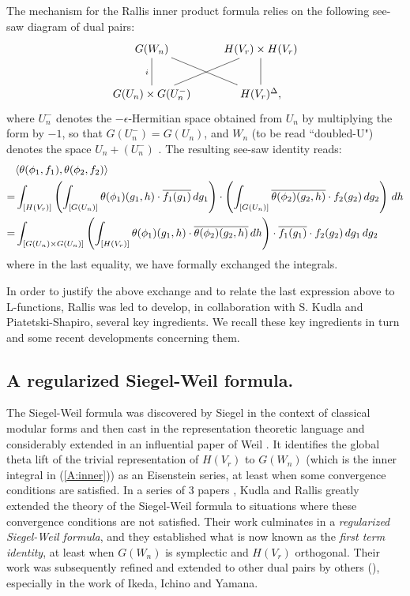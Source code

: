 \documentclass[10pt]{amsart}
\theoremstyle{plain}
\numberwithin{equation}{section}
\begin{document}
The mechanism for the Rallis inner product formula relies on the
following see-saw diagram of dual pairs:
\[
    \xymatrix{
    G(W_n)\ar@{-}[d]_{i}\ar@{-}[dr]&H(V_r)\times H(V_r)\ar@{-}[d]\\
    G(U_n)\times G(U^-_n)\ar@{-}[ur]&H(V_r)^{\Delta},
    }
\]
where $U^{-}_n$ denotes the $-\epsilon$-Hermitian space obtained from
$U_n$ by multiplying the form by $-1$, so that $G(U^-_n) = G(U_n)$,
and $W_n$ (to be read ``doubled-U") denotes the space $U_n + ( U^-_n)$
.  The resulting see-saw identity reads:  
\begin{align}  \label{A:inner}
 & \langle \theta(\phi_1, f_1), \theta(\phi_2,f_2) \rangle  \notag \\
 = & \int_{[H(V_r)]} \left( \int_{ [G(U_n)]} \theta(\phi_1)(g_1,h)
   \cdot \overline{f_1(g_1)} \, dg_1 \right) \cdot 
\left(  \int_{ [G(U_n)]} 
\overline{ \theta(\phi_2)(g_2,h)} \cdot f_2(g_2) \, dg_2 \right) \, dh \notag \\
= & \int_{ [G(U_n) \times  G(U_n)]} \left( \int_{ [H(V_r)]}
  \theta(\phi_1)(g_1, h) \cdot \overline{ \theta(\phi_2) (g_2,h)} \,
  dh \right) \cdot  
  \overline{f_1(g_1)} \cdot f_2(g_2) \, dg_1 \, dg_2 
\end{align}
where in the last equality, we have formally exchanged the integrals. 
\vskip 5pt

In order to justify the above exchange and to relate the last expression above to L-functions, 
Rallis was led to develop, in collaboration with S. Kudla and
Piatetski-Shapiro, several key ingredients. We recall these key
ingredients in turn and some recent developments concerning them.
\vskip 10pt

\subsection{\bf  A regularized Siegel-Weil formula.} 
The Siegel-Weil formula was discovered by Siegel in the context of
classical modular forms and then cast in the representation theoretic
language and considerably extended in an influential paper of Weil
\cite{We}. It identifies the global theta lift of the trivial
representation of $H(V_r)$ to
$G(W_n)$  (which is the inner integral in (\ref{A:inner}))  as an
Eisenstein series, at least when some convergence conditions are
satisfied. In a series of 3 papers \cite{KR1, KR2, KR5}, Kudla and Rallis
greatly extended the theory of the Siegel-Weil formula to situations
where these convergence conditions are not satisfied. Their work
culminates in a {\em regularized Siegel-Weil formula}, and they
established what is now known as the {\em first term identity}, at
least when $G(W_n)$ is symplectic and $H(V_r)$ orthogonal. Their work
was subsequently refined and extended to other dual pairs  by others
(\cite{Ik, I1, I2, I3, Y2, Y3, Mo, JS}), especially in the work of Ikeda, Ichino and Yamana.
\vskip 5pt
\end{document}
